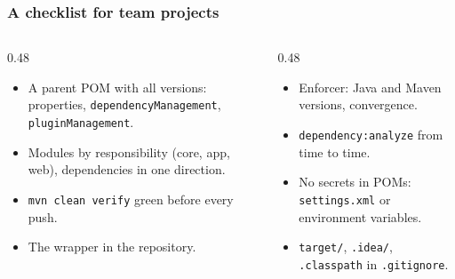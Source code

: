 \documentclass[aspectratio=169,10pt,compress]{beamer}
\begin{document}
\begin{frame}[t,fragile] \frametitle{A checklist for team projects}
  \begin{columns}[T]
    \begin{column}{0.48\textwidth}
      \begin{itemize}\small
        \item A parent POM with all versions: properties, \texttt{dependencyManagement}, \texttt{pluginManagement}.
        \item Modules by responsibility (core, app, web), dependencies in one direction.
        \item \texttt{mvn clean verify} green before every push.
        \item The wrapper in the repository.
      \end{itemize}
    \end{column}
    \begin{column}{0.48\textwidth}
      \begin{itemize}\small
        \item Enforcer: Java and Maven versions, convergence.
        \item \texttt{dependency:analyze} from time to time.
        \item No secrets in POMs: \texttt{settings.xml} or environment variables.
        \item \texttt{target/}, \texttt{.idea/}, \texttt{.classpath} in \texttt{.gitignore}.
      \end{itemize}
    \end{column}
  \end{columns}
\end{frame}

\end{document}
